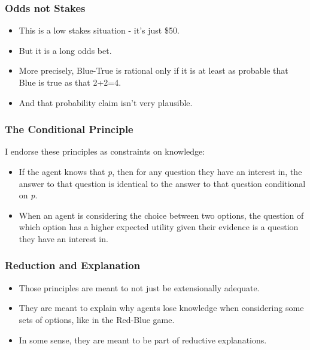 \begin{frame}

\frametitle{Odds not Stakes}
\label{oddsnotstakes}

\begin{itemize}
\item This is a low stakes situation - it's just \$50.

\item But it is a long odds bet.

\item More precisely, Blue-True is rational only if it is at least as probable that Blue is true as that 2+2=4.

\item And that probability claim isn't very plausible.

\end{itemize}
\end{frame}

\begin{frame}

\frametitle{The Conditional Principle}
\label{theconditionalprinciple}

I endorse these principles as constraints on knowledge:

\begin{itemize}
\item If the agent knows that \emph{p}, then for any question they have an interest in, the answer to that question is identical to the answer to that question conditional on \emph{p}.

\item When an agent is considering the choice between two options, the question of which option has a higher expected utility given their evidence is a question they have an interest in.

\end{itemize}
\end{frame}

\begin{frame}

\frametitle{Reduction and Explanation}
\label{reductionandexplanation}

\begin{itemize}
\item Those principles are meant to not just be extensionally adequate.

\item They are meant to explain why agents lose knowledge when considering some sets of options, like in the Red-Blue game.

\item In some sense, they are meant to be part of reductive explanations.

\end{itemize}
\end{frame}

